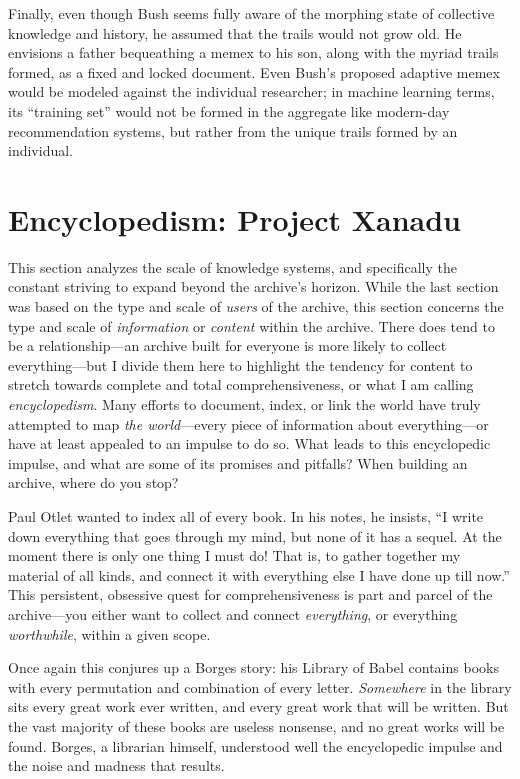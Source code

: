 Finally, even though Bush seems fully aware of the morphing state of collective knowledge and history, he assumed that the trails would not grow old. He envisions a father bequeathing a memex to his son, along with the myriad trails formed, as a fixed and locked document. Even Bush's proposed adaptive memex would be modeled against the individual researcher; in machine learning terms, its ``training set'' would not be formed in the aggregate like modern-day recommendation systems, but rather from the unique trails formed by an individual.

\section{Encyclopedism: Project Xanadu}

This section analyzes the scale of knowledge systems, and specifically the constant striving to expand beyond the archive's horizon. While the last section was based on the type and scale of \emph{users} of the archive, this section concerns the type and scale of \emph{information} or \emph{content} within the archive. There does tend to be a relationship---an archive built for everyone is more likely to collect everything---but I divide them here to highlight the tendency for content to stretch towards complete and total comprehensiveness, or what I am calling \emph{encyclopedism}. Many efforts to document, index, or link the world have truly attempted to map \emph{the world}---every piece of information about everything---or have at least appealed to an impulse to do so. What leads to this encyclopedic impulse, and what are some of its promises and pitfalls? When building an archive, where do you stop?

Paul Otlet wanted to index all of every book. In his notes, he insists, ``I write down everything that goes through my mind, but none of it has a sequel. At the moment there is only one thing I must do! That is, to gather together my material of all kinds, and connect it with everything else I have done up till now.''\autocite[20]{reagle_good_2010} This persistent, obsessive quest for comprehensiveness is part and parcel of the archive---you either want to collect and connect \emph{everything}, or everything \emph{worthwhile}, within a given scope.

Once again this conjures up a Borges story: his Library of Babel contains books with every permutation and combination of every letter. \emph{Somewhere} in the library sits every great work ever written, and every great work that will be written. But the vast majority of these books are useless nonsense, and no great works will be found. Borges, a librarian himself, understood well the encyclopedic impulse and the noise and madness that results.\autocite[112-18]{borges_collected_1999}

